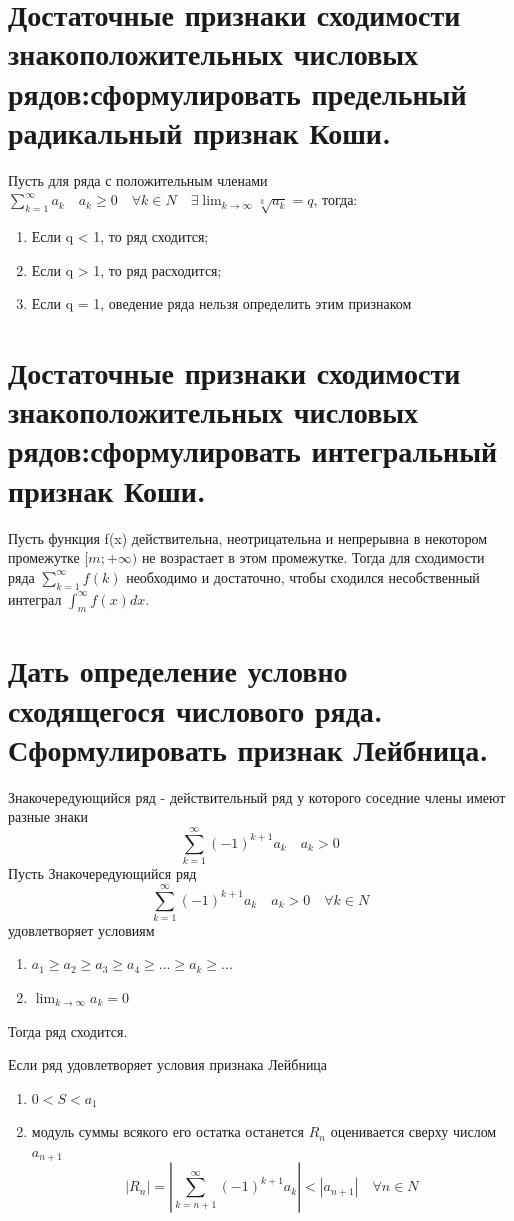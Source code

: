 \documentclass[16pt]{extarticle}
\begin{document}
\section{Достаточные признаки сходимости знакоположительных числовых рядов:сформулировать предельный радикальный признак Коши.}
Пусть для ряда с положительным членами  $\sum_{k=1}^{\infty} a_k \quad a_k  \geq 0 \quad \forall k \in N \quad \exists \lim_{k \to \infty} \sqrt[k]{a_k}  = q $, тогда:
\begin{enumerate}
\item Если q < 1, то ряд сходится;
\item Если q > 1, то ряд расходится;
\item Если q = 1, оведение ряда нельзя определить этим признаком
\end{enumerate}
\section{Достаточные признаки сходимости знакоположительных числовых рядов:сформулировать интегральный признак Коши.}
Пусть функция f(x) действительна, неотрицательна и непрерывна в некотором промежутке $[m; +\infty )$ не возрастает в этом промежутке. Тогда для сходимости ряда $\sum_{k=1}^{\infty} f(k)$ необходимо и достаточно, чтобы сходился несобственный интеграл $\int_{m}^{\infty}f(x)dx$.
\section{Дать определение условно сходящегося числового ряда. Сформулировать признак Лейбница.}
Знакочередующийся ряд  - действительный ряд у которого соседние члены имеют разные знаки
\begin{equation}
\sum_{k=1}^{\infty}(-1)^{k+1} a_k \quad a_k > 0
\end{equation}
Пусть Знакочередующийся ряд
\begin{equation}
\sum_{k=1}^{\infty}(-1)^{k+1} a_k \quad a_k > 0  \quad \forall k \in N
\end{equation}
удовлетворяет условиям
\begin{enumerate}
\item $a_1 \geq a_2 \geq a_3 \geq a_4 \geq \text{...} \geq a_k \geq \text{...}$
\item  $\lim_{k \to \infty} a_k = 0$
\end{enumerate}
Тогда ряд сходится.

Если ряд удовлетворяет условия признака Лейбница
\begin{enumerate}
\item $0 < S < a_1$
\item модуль суммы всякого его остатка останется $R_n$ оценивается сверху числом $a_{n+1}$
  \begin{equation}
    |R_n| = | \sum_{k=n+1}^{\infty} (-1)^{k+1} a_k | < |a_{n+1}| \quad \forall n \in N
  \end{equation}
\end{enumerate}
\end{document}
